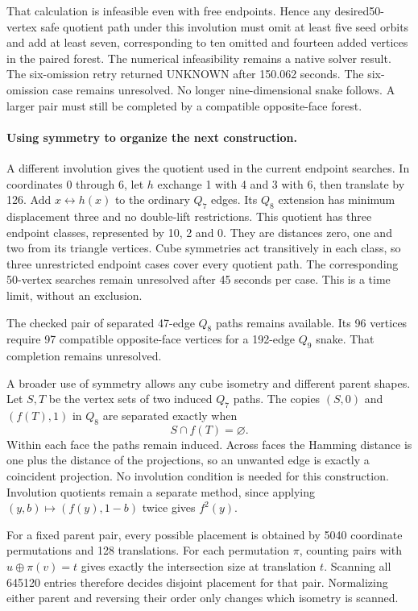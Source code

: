 \documentclass[11pt,a4paper]{article}
\begin{document}
That calculation is infeasible even with free endpoints. Hence any
desired50-vertex safe quotient path under this involution must omit
at least five seed orbits and add at least seven, corresponding to
ten omitted and fourteen added vertices in the paired forest.
The numerical infeasibility remains a native solver result.
The six-omission retry returned UNKNOWN after 150.062 seconds. The six-omission case remains unresolved.
No longer nine-dimensional snake follows. A larger pair must still
be completed by a compatible opposite-face forest.


\paragraph{Using symmetry to organize the next construction.}
A different involution gives the quotient used in the current endpoint
searches. In coordinates 0 through 6, let $h$ exchange 1 with 4 and
3 with 6, then translate by 126. Add $x\leftrightarrow h(x)$ to the
ordinary $Q_7$ edges. Its $Q_8$ extension has minimum displacement three
and no double-lift restrictions. This quotient has three endpoint
classes, represented by 10, 2 and 0. They are distances zero, one and
two from its triangle vertices. Cube symmetries act transitively in
each class, so three unrestricted endpoint cases cover every quotient
path. The corresponding 50-vertex searches remain unresolved after
45 seconds per case. This is a time limit, without an exclusion.

The checked pair of separated 47-edge $Q_8$ paths remains available.
Its 96 vertices require 97 compatible opposite-face vertices for a
192-edge $Q_9$ snake. That completion remains unresolved.

A broader use of symmetry allows any cube isometry and different
parent shapes. Let $S,T$ be the vertex sets of two induced $Q_7$ paths.
The copies $(S,0)$ and $(f(T),1)$ in $Q_8$ are separated exactly when
\[
S\cap f(T)=\varnothing.
\]
Within each face the paths remain induced. Across faces the Hamming
distance is one plus the distance of the projections, so an unwanted
edge is exactly a coincident projection. No involution condition is
needed for this construction. Involution quotients remain a separate
method, since applying $(y,b)\mapsto(f(y),1-b)$ twice gives $f^2(y)$.

For a fixed parent pair, every possible placement is obtained by
5040 coordinate permutations and 128 translations. For each permutation
$\pi$, counting pairs with $u\oplus\pi(v)=t$ gives exactly the
intersection size at translation $t$. Scanning all 645120 entries
therefore decides disjoint placement for that pair. Normalizing either
parent and reversing their order only changes which isometry is scanned.
\end{document}
